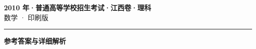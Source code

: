 \documentclass[zihao=5, a4paper]{ctexart}
\begin{document}
\begin{center}
  {\Large\bfseries 2010 年·普通高等学校招生考试·江西卷·理科}\\[4pt]
  {\large 数学 · 印刷版}
\end{center}
\medskip
{}

\par\bigskip\hrule\bigskip
{}
\begin{center}{\large\bfseries 参考答案与详细解析}\end{center}
\smallskip

\end{document}
